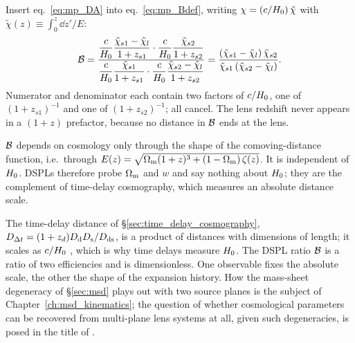 Insert eq.~\eqref{eq:mp_DA} into eq.~\eqref{eq:mp_Bdef}, writing
$\chi=(c/H_0)\,\tilde\chi$ with $\tilde\chi(z)\equiv\int_0^z\dd z'/E$:
\begin{equation}
  \mathcal{B}
  = \frac{\dfrac{c}{H_0}\dfrac{\tilde\chi_{s1}-\tilde\chi_l}{1+z_{s1}}\cdot
          \dfrac{c}{H_0}\dfrac{\tilde\chi_{s2}}{1+z_{s2}}}
         {\dfrac{c}{H_0}\dfrac{\tilde\chi_{s1}}{1+z_{s1}}\cdot
          \dfrac{c}{H_0}\dfrac{\tilde\chi_{s2}-\tilde\chi_l}{1+z_{s2}}}
  = \frac{(\tilde\chi_{s1}-\tilde\chi_l)\,\tilde\chi_{s2}}
         {\tilde\chi_{s1}\,(\tilde\chi_{s2}-\tilde\chi_l)} .
  \label{eq:mp_Bcancel}
\end{equation}
Numerator and denominator each contain two factors of $c/H_0$, one
of $(1+z_{s1})^{-1}$ and one of $(1+z_{s2})^{-1}$; all cancel.  The lens
redshift never appears in a $(1+z)$ prefactor, because no distance in
$\mathcal{B}$ ends at the lens.  

\begin{keybox}
$\mathcal{B}$ depends on cosmology only through the shape of the
comoving-distance function, i.e.\ through
$E(z)=\sqrt{\Omega_{\mathrm{m}}(1+z)^3+(1-\Omega_{\mathrm{m}})\,\zeta(z)}$.  It is independent
of $H_0$.  DSPLs therefore probe $\Omega_{\mathrm{m}}$ and $w$ and say nothing
about $H_0$; they are the complement of time-delay cosmography, which
measures an absolute distance scale.
\end{keybox}

\begin{bridge}
The time-delay distance of \S\ref{sec:time_delay_cosmography},
$D_{\Delta t}=(1+z_d)D_{\mathrm{d}}D_{\mathrm{s}}/D_{\mathrm{ds}}$, is a product of distances with
dimensions of length; it scales as $c/H_0$ , which is
why time delays measure $H_0$.  The DSPL ratio $\mathcal{B}$ is a ratio of
two efficiencies and is dimensionless.  One observable fixes the
absolute scale, the other the shape of the expansion history.  How the
mass-sheet degeneracy of \S\ref{sec:msd} plays out with two source planes
is the subject of Chapter~\ref{ch:msd_kinematics}; the question of
whether cosmological parameters can be recovered from multi-plane lens
systems at all, given such degeneracies, is posed in the title of
\citet{schneider_2014_multiplane}.
\end{bridge}

